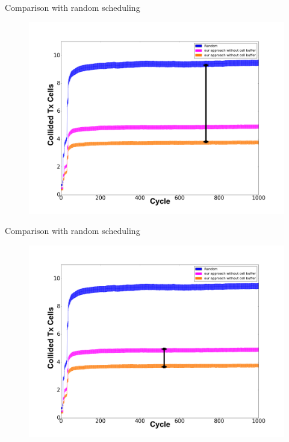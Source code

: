 \begin{withoutheadline}
\addtocounter{framenumber}{-1}
\begin{frame}{Comparison with random scheduling}

\begin{figure}[p]


\includegraphics[width=\linewidth]{figures/graph1-1.png}
\end{figure}



\end{frame}
\end{withoutheadline}

\begin{withoutheadline}
\addtocounter{framenumber}{-1}
\begin{frame}{Comparison with random scheduling}

\begin{figure}[p]


\includegraphics[width=\linewidth]{figures/graph1-2.png}
\end{figure}



\end{frame}
\end{withoutheadline}


